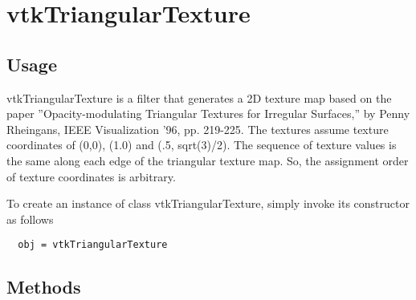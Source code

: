 \section{vtkTriangularTexture}

\subsection{Usage}

 vtkTriangularTexture is a filter that generates a 2D texture map based on 
 the paper ''Opacity-modulating Triangular Textures for Irregular Surfaces,''
 by Penny Rheingans, IEEE Visualization '96, pp. 219-225.
 The textures assume texture coordinates of (0,0), (1.0) and
 (.5, sqrt(3)/2). The sequence of texture values is the same along each
 edge of the triangular texture map. So, the assignment order of texture
 coordinates is arbitrary.

To create an instance of class vtkTriangularTexture, simply
invoke its constructor as follows
\begin{verbatim}
  obj = vtkTriangularTexture
\end{verbatim}
\subsection{Methods}

